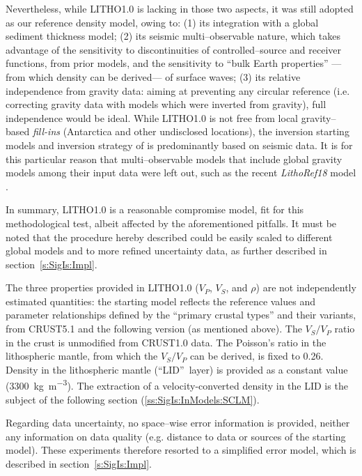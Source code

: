 Nevertheless, while {LITHO1.0} is lacking in those two aspects, it was still adopted as our reference density model, owing to:
(1) its integration with a global sediment thickness model;
(2) its seismic multi--observable nature, which takes advantage of the sensitivity to discontinuities of controlled--source and receiver functions, from prior models, and the sensitivity to ``bulk Earth properties'' ---from which density can be derived--- of surface waves;
(3) its relative independence from gravity data: aiming at preventing any circular reference (i.e. correcting gravity data with models which were inverted from gravity), full independence would be ideal. While {LITHO1.0} is not free from local gravity--based \textit{fill-ins} (Antarctica and other undisclosed locations), the inversion starting models and inversion strategy of \textcite{Pasyanos2014} is predominantly based on seismic data.
It is for this particular reason that multi--observable models that include global gravity models among their input data were left out, such as the recent \textit{LithoRef18} model \parencite{Afonso2019}.

In summary, {LITHO1.0} is a reasonable compromise model, fit for this methodological test, albeit affected by the aforementioned pitfalls.
It must be noted that the procedure hereby described could be easily scaled to different global models and to more refined uncertainty data, as further described in section~\ref{s:SigIs:Impl}.

The three properties provided in {LITHO1.0} ($V_P$, $V_S$, and $\rho$) are not independently estimated quantities: the starting model reflects the reference values and parameter relationships defined by the  ``primary crustal types'' and their variants, from {CRUST5.1} \parencite{Mooney1998_Crust51} and the following version (as mentioned above).
The $V_S/V_P$ ratio in the crust is unmodified from CRUST1.0 data.
The Poisson's ratio \parencite[see e.g.][]{Sheriff2002} in the lithospheric mantle, from which the $V_S/V_P$ can be derived, is fixed to \num{0.26}.
Density in the lithospheric mantle (``LID''~layer) is provided as a constant value (\SI{3300}{\kilo \gram \per \cubic \metre}).
The extraction of a velocity-converted density in the LID is the subject of the following section (\ref{ss:SigIs:InModels:SCLM}).

Regarding data uncertainty, no space--wise error information is provided, neither any information on data quality (e.g. distance to data or sources of the starting model).
These experiments therefore resorted to a simplified error model, which is described in section~\ref{s:SigIs:Impl}.

